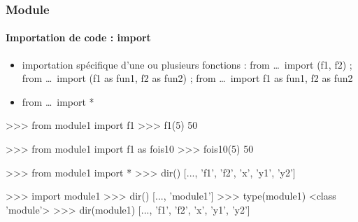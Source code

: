 \begin{frame}[fragile]
\frametitle{Module}
\framesubtitle{Importation de code : import}
\begin{itemize}
\item importation spécifique d'une ou plusieurs fonctions : from \dots\ import (f1, f2) ; from \dots\ import (f1 as fun1, f2 as fun2) ; from \dots\ import f1 as fun1, f2 as fun2
\item from \dots\ import *
\end{itemize}
\begin{pythonConsole}
>>> from module1 import f1 
>>> f1(5)
50
\end{pythonConsole}
\begin{pythonConsole}
>>> from module1 import f1 as fois10 
>>> fois10(5)
50
\end{pythonConsole}
\begin{pythonConsole}
>>> from module1 import *
>>> dir()
[..., 'f1', 'f2', 'x', 'y1', 'y2']
\end{pythonConsole}
\begin{pythonConsole}
>>> import module1
>>> dir()
[..., 'module1']
>>> type(module1)
<class 'module'>
>>> dir(module1)
[..., 'f1', 'f2', 'x', 'y1', 'y2']
\end{pythonConsole}
\end{frame}

